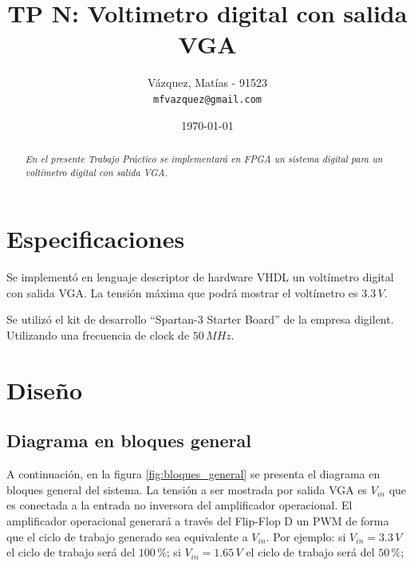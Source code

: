 \documentclass[10pt,spanish,a4paper,openany,notitlepage]{article}
\begin{document}
\title{\textbf{TP N: Voltimetro digital con salida VGA}}
\author{
 Vázquez, Matías - 91523\\
 \texttt{mfvazquez@gmail.com}
}
\date{\today}
\maketitle

\begin{abstract} %
\emph{En el presente Trabajo Práctico se implementará en FPGA un sistema
digital para un voltímetro digital con salida VGA.}
\end{abstract}

\section{Especificaciones}

Se implementó en lenguaje descriptor de hardware VHDL un voltímetro digital 
con salida VGA. La tensión máxima que podrá mostrar el voltímetro es $3.3\,\unit{V}$.

Se utilizó el kit de desarrollo ``Spartan-3 Starter Board'' de la empresa
digilent. Utilizando una frecuencia de clock de $50\, \unit{MHz}$.

\section{Diseño}

\subsection{Diagrama en bloques general}

A continuación, en la figura \ref{fig:bloques_general} se presenta
el diagrama en bloques general del sistema.
La tensión a ser mostrada por salida VGA es $V_{in}$ que es conectada
a la entrada no inversora del amplificador operacional. El amplificador
operacional generará a través del Flip-Flop D un PWM de forma que el
ciclo de trabajo generado sea equivalente a $V_{in}$. Por ejemplo:
si $V_{in} = 3.3\,\unit{V}$ el ciclo de trabajo será del $100\,\unit{\%}$;
si $V_{in} = 1.65\,\unit{V}$ el ciclo de trabajo será del $50\,\unit{\%}$;
\end{document}
